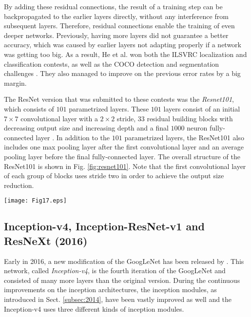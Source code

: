 \documentclass[conference]{IEEEtran}
\begin{document}
By adding these residual connections, the result of a training step can be backpropagated to the earlier layers directly, without any interference from subsequent layers. Therefore, residual connections enable the training of even deeper networks. Previously, having more layers did not guarantee a better accuracy, which was caused by earlier layers not adapting properly if a network was getting too big. As a result, He et al. won both the ILSVRC localization and classification contests, as well as the COCO detection and segmentation challenges \cite{COCO}. They also managed to improve on the previous error rates by a big margin. 

The ResNet version that was submitted to these contests was the \emph{Resnet101}, which consists of $101$ parametrized layers. These $101$ layers consist of an initial $7 \times 7$ convolutional layer with a $2 \times 2$ stride, $33$ residual building blocks with decreasing output size and increasing depth and a final $1000$ neuron fully-connected layer  \cite{ResNet}. In addition to the $101$ parametrized layers, the ResNet101 also includes one max pooling layer after the first convolutional layer and an average pooling layer before the final fully-connected layer. The overall structure of the ResNet101 is shown in Fig. \ref{fig:resnet101}. Note that the first convolutional layer of each group of blocks uses stride two in order to achieve the output size reduction.

\begin{figure*}
\texttt{[image: Fig17.eps]}
\caption{The ResNet101, consisting of a $7 \times 7$ convolutional layer, a $2 \times 2$ max pooling layer, 33 residual blocks, a $7 \times 7$ average pooling layer and a final fully-connected layer before the output layer}
\label{fig:resnet101}
\end{figure*}

\subsection{Inception-v4, Inception-ResNet-v1 and ResNeXt (2016)}\label{subsec:2016}
Early in 2016, a new modification of the GoogLeNet has been released by \cite{Inception}. This network, called \emph{Inception-v4}, is the fourth iteration of the GoogLeNet and consisted of many more layers than the original version. During the continuous improvements on the inception architectures, the inception modules, as introduced in Sect. \ref{subsec:2014}, have been vastly improved as well and the Inception-v4 uses three different kinds of inception modules. 
\end{document}
